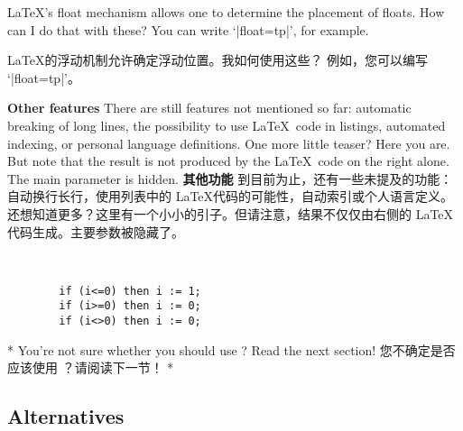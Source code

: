 \begin{advise}
\begin{paracol}{2}    
\item \LaTeX's float mechanism allows one to determine the placement of floats.
      How can I do that with these?
      \advisespace
      You can write `|float=tp|', for example.
\switchcolumn
\item \LaTeX 的浮动机制允许确定浮动位置。我如何使用这些？
\advisespace
例如，您可以编写 `|float=tp|'。
\end{paracol}
\end{advise}

\begin{paracol}{2}
\textbf{Other features}
There are still features not mentioned so far: automatic breaking of long
lines, the possibility to use \LaTeX\ code in listings, automated indexing,
or personal language definitions.
One more little teaser? Here you are. But note that the result is not
produced by the \LaTeX\ code on the right alone. The main parameter is
hidden.
\switchcolumn
\textbf{其他功能}
到目前为止，还有一些未提及的功能：自动换行长行，使用列表中的 \LaTeX 代码的可能性，自动索引或个人语言定义。
还想知道更多？这里有一个小小的引子。但请注意，结果不仅仅由右侧的 \LaTeX 代码生成。主要参数被隐藏了。

\begin{lstsample}{^^A
        }{}
        \begin{lstlisting}
        if (i<=0) then i := 1;
        if (i>=0) then i := 0;
        if (i<>0) then i := 0;
        \end{lstlisting}
\end{lstsample} 


\switchcolumn[0]*%
You're not sure whether you should use ?
Read the next section!
\switchcolumn
您不确定是否应该使用  ？请阅读下一节！
\switchcolumn[0]*%
\subsection{Alternatives}
\switchcolumn


\end{paracol}
